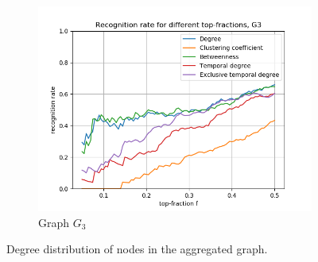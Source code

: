 \documentclass[letterpaper]{article}
\begin{document}
\begin{figure}
\begin{subfigure}[b]{0.32\textwidth}
        \includegraphics[width=\textwidth]{img/rankG3.png}
        \caption{Graph \(G_3\)}
	    \label{fig:recognition_rates_G3}
    \end{subfigure}
    \caption{\small{Degree distribution of nodes in the aggregated graph.}}
    \label{fig:recognition_rates}
	
	\bigskip
	

\end{figure}
\end{document}
